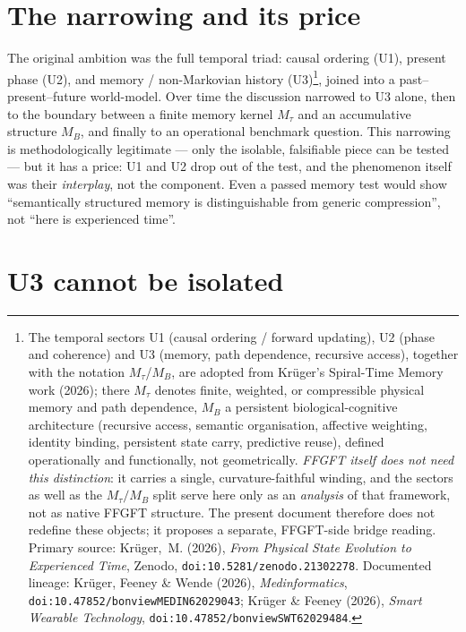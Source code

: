 \section{The narrowing and its price}

The original ambition was the full temporal triad: causal ordering (U1), present phase
(U2), and memory / non-Markovian history (U3)\footnote{The temporal sectors U1 (causal ordering / forward updating), U2 (phase and coherence) and U3 (memory, path dependence, recursive access), together with the notation $M_\tau$/$M_B$, are adopted from Krüger's Spiral-Time Memory work (2026); there $M_\tau$ denotes finite, weighted, or compressible physical memory and path dependence, $M_B$ a persistent biological-cognitive architecture (recursive access, semantic organisation, affective weighting, identity binding, persistent state carry, predictive reuse), defined operationally and functionally, not geometrically. \emph{FFGFT itself does not need this distinction}: it carries a single, curvature-faithful winding, and the sectors as well as the $M_\tau/M_B$ split serve here only as an \emph{analysis} of that framework, not as native FFGFT structure. The present document therefore does not redefine these objects; it proposes a separate, FFGFT-side bridge reading. Primary source: Krüger,~M. (2026), \emph{From Physical State Evolution to Experienced Time}, Zenodo, \texttt{doi:10.5281/zenodo.21302278}. Documented lineage: Krüger, Feeney \& Wende (2026), \emph{Medinformatics}, \texttt{doi:10.47852/bonviewMEDIN62029043}; Krüger \& Feeney (2026), \emph{Smart Wearable Technology}, \texttt{doi:10.47852/bonviewSWT62029484}.}, joined into a past--present--future
world-model. Over time the discussion narrowed to U3 alone, then to the boundary between a
finite memory kernel $M_\tau$ and an accumulative structure $M_B$, and finally to an
operational benchmark question. This narrowing is methodologically legitimate --- only the
isolable, falsifiable piece can be tested --- but it has a price: U1 and U2 drop out of the
test, and the phenomenon itself was their \emph{interplay}, not the component. Even a passed
memory test would show \enquote{semantically structured memory is distinguishable from
generic compression}, not \enquote{here is experienced time}.

\section{U3 cannot be isolated}

